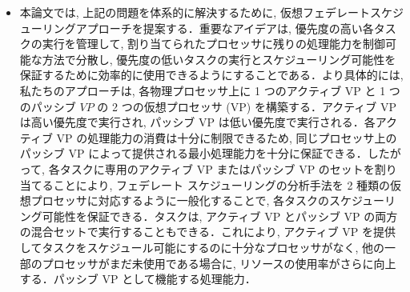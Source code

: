 \begin{frame}{}
    \begin{itemize}
        \item 本論文では, 上記の問題を体系的に解決するために, 仮想フェデレートスケジューリングアプローチを提案する．重要なアイデアは, 優先度の高い各タスクの実行を管理して, 割り当てられたプロセッサに残りの処理能力を制御可能な方法で分散し, 優先度の低いタスクの実行とスケジューリング可能性を保証するために効率的に使用できるようにすることである．より具体的には, 私たちのアプローチは, 各物理プロセッサ上に 1 つのアクティブ VP と 1 つのパッシブ $V P$ の 2 つの仮想プロセッサ (VP) を構築する．アクティブ VP は高い優先度で実行され, パッシブ VP は低い優先度で実行される．各アクティブ VP の処理能力の消費は十分に制限できるため, 同じプロセッサ上のパッシブ VP によって提供される最小処理能力を十分に保証できる．したがって, 各タスクに専用のアクティブ VP またはパッシブ VP のセットを割り当てることにより, フェデレート スケジューリングの分析手法を 2 種類の仮想プロセッサに対応するように一般化することで, 各タスクのスケジューリング可能性を保証できる．タスクは, アクティブ VP とパッシブ VP の両方の混合セットで実行することもできる．これにより, アクティブ VP を提供してタスクをスケジュール可能にするのに十分なプロセッサがなく, 他の一部のプロセッサがまだ未使用である場合に, リソースの使用率がさらに向上する．パッシブ VP として機能する処理能力．
    \end{itemize}
\end{frame}
